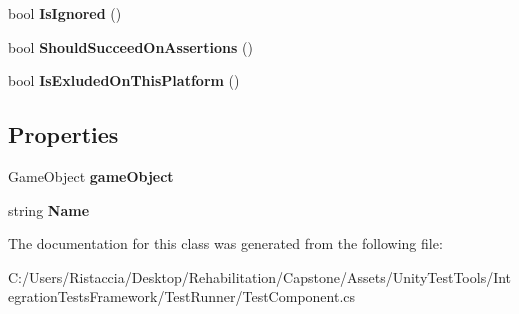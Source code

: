 \begin{DoxyCompactItemize}
\item 
\mbox{\label{class_unity_test_1_1_test_component_1_1_null_test_component_impl_ab5127f48edc8cbdb16a5e52ba8b349c6}} 
bool {\bfseries Is\+Ignored} ()
\item 
\mbox{\label{class_unity_test_1_1_test_component_1_1_null_test_component_impl_a70c7c3a955bc45d3d290690ef846abbe}} 
bool {\bfseries Should\+Succeed\+On\+Assertions} ()
\item 
\mbox{\label{class_unity_test_1_1_test_component_1_1_null_test_component_impl_a8a05d1530c354cf2dbd6b027fbc7b2ae}} 
bool {\bfseries Is\+Exluded\+On\+This\+Platform} ()
\end{DoxyCompactItemize}
\subsection*{Properties}
\begin{DoxyCompactItemize}
\item 
\mbox{\label{class_unity_test_1_1_test_component_1_1_null_test_component_impl_af9be3c71aef6af42479904d9dda19a7c}} 
Game\+Object {\bfseries game\+Object}
\item 
\mbox{\label{class_unity_test_1_1_test_component_1_1_null_test_component_impl_a691c904e63f0ffa52c9d4859f45a8a0d}} 
string {\bfseries Name}
\end{DoxyCompactItemize}


The documentation for this class was generated from the following file\+:\begin{DoxyCompactItemize}
\item 
C\+:/\+Users/\+Ristaccia/\+Desktop/\+Rehabilitation/\+Capstone/\+Assets/\+Unity\+Test\+Tools/\+Integration\+Tests\+Framework/\+Test\+Runner/Test\+Component.\+cs\end{DoxyCompactItemize}
